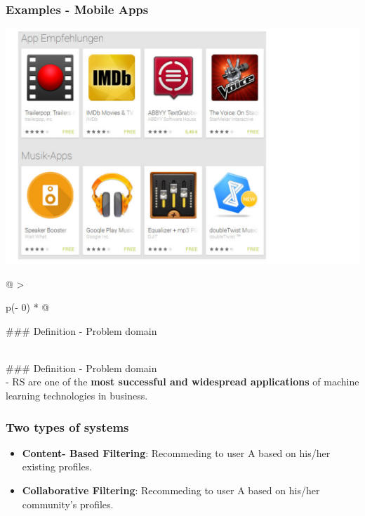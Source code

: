 \documentclass[
]{article}
\begin{document}
\hypertarget{examples---mobile-apps}{%
\subsubsection{Examples - Mobile Apps}\label{examples---mobile-apps}}

\includegraphics{images/rs4.png}

\begin{longtable}[]{@{}
  >{\raggedright\arraybackslash}p{(\columnwidth - 0\tabcolsep) * }@{}}
\toprule
\begin{minipage}[b]{\linewidth}\raggedright
\#\#\# Definition - Problem domain
\end{minipage} \\
\midrule
\endhead
\#\#\# Definition - Problem domain \\
- RS are one of the \textbf{most successful and widespread applications}
of machine learning technologies in business. \\
\bottomrule
\end{longtable}

\hypertarget{two-types-of-systems}{%
\subsubsection{Two types of systems}\label{two-types-of-systems}}

\begin{itemize}
\item
  \textbf{Content- Based Filtering}: Recommeding to user A based on
  his/her existing profiles.
\item
  \textbf{Collaborative Filtering}: Recommeding to user A based on
  his/her community's profiles.
\end{itemize}
\end{document}
